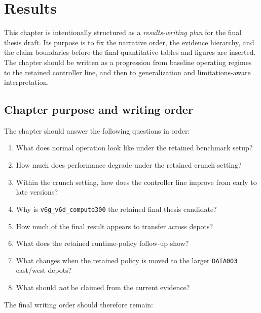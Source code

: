 \chapter{Results}
\label{chap:results}

This chapter is intentionally structured as a \emph{results-writing plan} for the final thesis draft.
Its purpose is to fix the narrative order, the evidence hierarchy, and the claim boundaries before the final quantitative tables and figures are inserted.
The chapter should be written as a progression from baseline operating regimes to the retained controller line, and then to generalization and limitations-aware interpretation.

\section{Chapter purpose and writing order}
\label{sec:results-purpose}

The chapter should answer the following questions in order:

\begin{enumerate}
    \item What does normal operation look like under the retained benchmark setup?
    \item How much does performance degrade under the retained crunch setting?
    \item Within the crunch setting, how does the controller line improve from early to late versions?
    \item Why is \texttt{v6g\_v6d\_compute300} the retained final thesis candidate?
    \item How much of the final result appears to transfer across depots?
    \item What does the retained runtime-policy follow-up show?
    \item What changes when the retained policy is moved to the larger \texttt{DATA003} east/west depots?
    \item What should \emph{not} be claimed from the current evidence?
\end{enumerate}

The final writing order should therefore remain:

